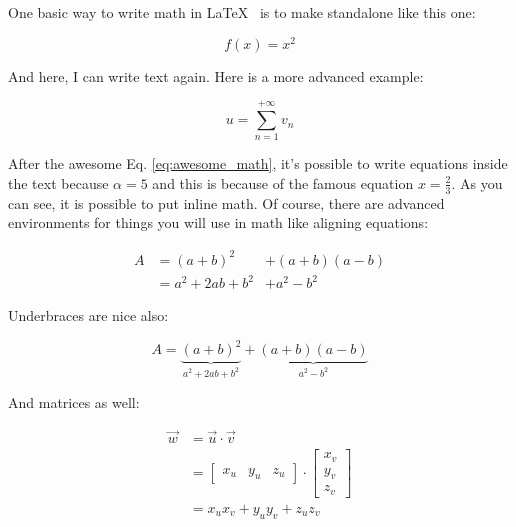 \documentclass[10pt,a4paper,twoside]{article}
\begin{document}
One basic way to write math in \LaTeX~ is to make standalone like this one:

$$
  f(x) = x^2
$$

\noindent And here, I can write text again.
Here is a more advanced example:

\begin{equation}
  u = \sum_{n=1}^{+\infty} v_n
  \label{eq:awesome_math}
\end{equation}

\noindent After the awesome Eq. \ref{eq:awesome_math}, it's possible to write equations inside the text because $\alpha = 5$ and this is because of the famous equation $x = \frac{2}{3}$.
As you can see, it is possible to put inline math.
Of course, there are advanced environments for things you will use in math like aligning equations:

\begin{align}
  A & = (a+b)^2        & + (a+b)(a-b)\nonumber \\
    & = a^2 + 2ab +b^2 & + a^2 - b^2
\end{align}

\noindent Underbraces are nice also:

\begin{equation}
  A = \underbrace{(a+b)^2}_{a^2 + 2ab +b^2}
  + \underbrace{(a+b)(a-b)}_{a^2 - b^2}
\end{equation}

\noindent And matrices as well:

\begin{align}
  \vec w & = \vec u \cdot \vec v         \\
         & =
  \begin{bmatrix}
    x_u & y_u & z_u
  \end{bmatrix}
  \cdot
  \begin{bmatrix}
    x_v \\ y_v \\ z_v
  \end{bmatrix}              \\
         & = x_u x_v + y_u y_v + z_u z_v
\end{align}
\end{document}
